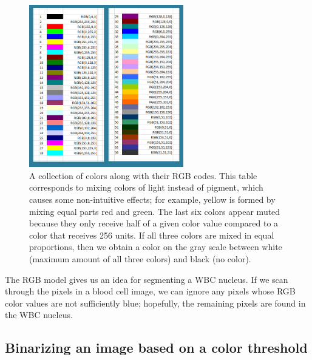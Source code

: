 \begin{figure}[h]
\centering
\mySfFamily
\includegraphics[width = 0.6\textwidth]{../images/RGB_color_chart.png}
\caption{A collection of colors along with their RGB codes. This table corresponds to mixing colors of light instead of pigment, which causes some non-intuitive effects; for example, yellow is formed by mixing equal parts red and green. The last six colors appear muted because they only receive half of a given color value compared to a color that receives 256 units. If all three colors are mixed in equal proportions, then we obtain a color on the gray scale between white (maximum amount of all three colors) and black (no color).}
\label{fig:RGB_color_chart}
\end{figure}

The RGB model gives us an idea for segmenting a WBC nucleus. If we scan through the pixels in a blood cell image, we can ignore any pixels whose RGB color values are not sufficiently blue; hopefully, the remaining pixels are found in the WBC nucleus.\\

\begin{qbox}\end{qbox}

\FloatBarrier
{}
\subsection{Binarizing an image based on a color threshold}

